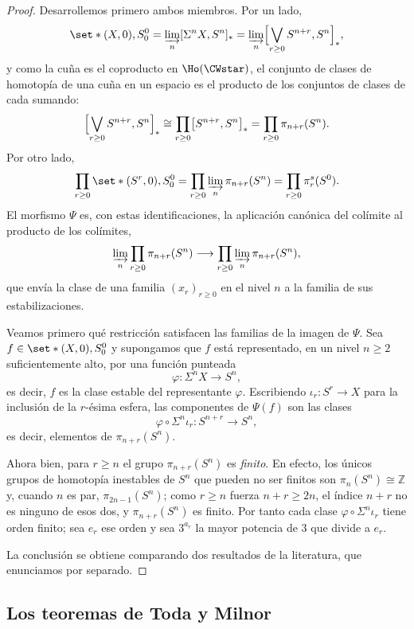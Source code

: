 \begin{proof}
Desarrollemos primero ambos miembros. Por un lado,
\[
\set*{(X,0),S^0_0}=\varinjlim_n[\Sigma^nX,S^n]_*=\varinjlim_n\Bigl[\bigvee_{r\ge0}S^{n+r},S^n\Bigr]_*,
\]
y como la cuña es el coproducto en $\Ho(\CWstar)$, el conjunto de clases de homotopía de una cuña en un espacio es el producto de los conjuntos de clases de cada sumando:
\[
\Bigl[\bigvee_{r\ge0}S^{n+r},S^n\Bigr]_*\cong\prod_{r\ge0}\bigl[S^{n+r},S^n\bigr]_*=\prod_{r\ge0}\pi_{n+r}(S^n).
\]
Por otro lado,
\[
\prod_{r\ge0}\set*{(S^r,0),S^0_0}=\prod_{r\ge0}\varinjlim_n\pi_{n+r}(S^n)=\prod_{r\ge0}\pi_r^s(S^0).
\]
El morfismo $\Psi$ es, con estas identificaciones, la aplicación canónica del colímite al producto de los colímites,
\[
\varinjlim_n\prod_{r\ge0}\pi_{n+r}(S^n)\longrightarrow\prod_{r\ge0}\varinjlim_n\pi_{n+r}(S^n),
\]
que envía la clase de una familia $(x_r)_{r\ge0}$ en el nivel $n$ a la familia de sus estabilizaciones.

Veamos primero qué restricción satisfacen las familias de la imagen de $\Psi$. Sea $f\in\set*{(X,0),S^0_0}$ y supongamos que $f$ está representado, en un nivel $n\geq2$ suficientemente alto, por una función punteada
\[
\varphi\colon\Sigma^nX\longrightarrow S^n,
\]
es decir, $f$ es la clase estable del representante $\varphi$. Escribiendo $\iota_r\colon S^r\to X$ para la inclusión de la $r$-ésima esfera, las componentes de $\Psi(f)$ son las clases
\[
\varphi\circ\Sigma^n\iota_r\colon S^{n+r}\longrightarrow S^n,
\]
es decir, elementos de $\pi_{n+r}(S^n)$.

Ahora bien, para $r\ge n$ el grupo $\pi_{n+r}(S^n)$ es \emph{finito}. En efecto, los únicos grupos de homotopía inestables de $S^n$ que pueden no ser finitos son $\pi_n(S^n)\cong\mathbb Z$ y, cuando $n$ es par, $\pi_{2n-1}(S^n)$; como $r\ge n$ fuerza $n+r\ge2n$, el índice $n+r$ no es ninguno de esos dos, y $\pi_{n+r}(S^n)$ es finito. Por tanto cada clase $\varphi\circ\Sigma^n\iota_r$ tiene orden finito; sea $e_r$ ese orden y sea $3^{a_r}$ la mayor potencia de $3$ que divide a $e_r$.

La conclusión se obtiene comparando dos resultados de la literatura, que enunciamos por separado.
\end{proof}

\subsection{Los teoremas de Toda y Milnor}

